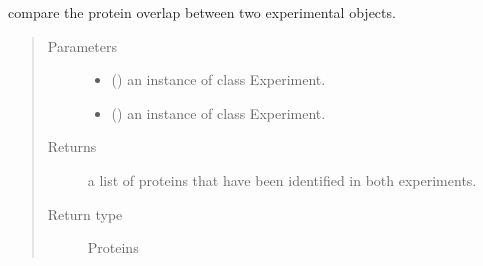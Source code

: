 \documentclass[letterpaper,10pt,english]{sphinxmanual}
\begin{document}
\begin{fulllineitems}
\label{\detokenize{IPTK.Analysis:IPTK.Analysis.AnalysisFunction.get_binnary_protein_overlap}}
compare the protein overlap between two experimental objects.
\begin{quote}\begin{description}
\item[{Parameters}] \leavevmode\begin{itemize}
\item {} 
 ({\hyperref[\detokenize{IPTK.Classes:IPTK.Classes.Experiment.Experiment}]{}}) \textendash{} an instance of class Experiment.

\item {} 
 ({\hyperref[\detokenize{IPTK.Classes:IPTK.Classes.Experiment.Experiment}]{}}) \textendash{} an instance of class Experiment.

\end{itemize}

\item[{Returns}] \leavevmode
a list of proteins that have been identified in both experiments.

\item[{Return type}] \leavevmode
Proteins

\end{description}\end{quote}

\end{fulllineitems}

\end{document}
